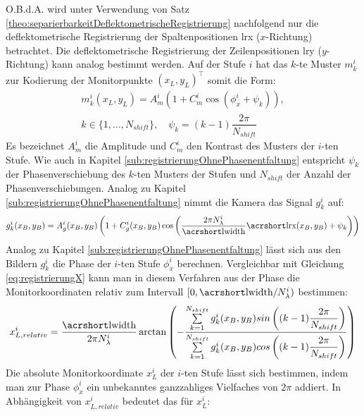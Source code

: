 \p
O.B.d.A. wird unter Verwendung von Satz \ref{theo:separierbarkeitDeflektometrischeRegistrierung} nachfolgend nur die deflektometrische Registrierung der Spaltenpositionen \acrshort{lrx} ($x$-Richtung) betrachtet.
Die deflektometrische Registrierung der Zeilenpositionen \acrshort{lry} ($y$-Richtung) kann analog bestimmt werden.
Auf der Stufe $i$ hat das $k$-te Muster $m_k^i$ zur Kodierung der Monitorpunkte $(x_L, y_L)^\top$ somit die Form:
%
\begin{equation}\label{eq:monitormuster_mehrstufig}
	\begin{gathered}	
		m_k^i(x_L,y_L) = A_m^i \left(1 + C_m^i \cos \left(\phi_x^i + \psi_k\right)\right),\\
		k \in \lbrace 1,\ldots,N_{shift}\rbrace,
		\quad
		\psi_k = (k - 1)\dfrac{2\pi}{N_{shift}}
	\end{gathered}
\end{equation}
%
Es bezeichnet $A_m^i$ die Amplitude und $C_m^i$ den Kontrast des Musters der $i$-ten Stufe.
Wie auch in Kapitel \ref{sub:registrierungOhnePhasenentfaltung} entspricht $\psi_k$ der Phasenverschiebung des $k$-ten Musters der Stufen und $N_{shift}$ der Anzahl der Phasenverschiebungen.
Analog zu Kapitel \ref{sub:registrierungOhnePhasenentfaltung} nimmt die Kamera das Signal $g_k^i$ auf:
%
\begin{equation}\label{eq:kamerabild_mehrstufig}
	g_k^i(x_B, y_B) = A_g^i(x_B, y_B) \left(1 + C_g^i(x_B, y_B) \cos \left(\dfrac{2\pi N_\lambda^i}{\acrshortmath{lwidth}}\acrshortmath{lrx}(x_B, y_B) + \psi_k\right)\right)
\end{equation}
%
Analog zu Kapitel \ref{sub:registrierungOhnePhasenentfaltung} lässt sich aus den Bildern $g_k^i$ die Phase der $i$-ten Stufe $\phi_x^i$ berechnen.
Vergleichbar mit Gleichung \ref{eq:registrierungX} kann man in diesem Verfahren aus der Phase die Monitorkoordinaten relativ zum Intervall $[0,\acrshortmath{lwidth}/N_\lambda^i)$ bestimmen:
%
\begin{equation}\label{eq:registrierungX_relativ}
	x_{L,relativ}^i =
	\dfrac{\acrshortmath{lwidth}}{2\pi N_\lambda^i}
	\arctan 
	\left( 
		-\dfrac
		{\sum\limits_{k=1}^{N_{shift}} g_k^i(x_B, y_B) sin\left((k - 1)\dfrac{2\pi}{N_{shift}}\right)}
		{\sum\limits_{k=1}^{N_{shift}} g_k^i(x_B, y_B) cos\left((k - 1)\dfrac{2\pi}{N_{shift}}\right)}
	\right)
\end{equation}
%
Die absolute Monitorkoordinate $x_L^i$ der $i$-ten Stufe lässt sich bestimmen, indem man zur Phase $\phi_x^i$ ein unbekanntes ganzzahliges Vielfaches von $2\pi$ addiert.
In Abhängigkeit von $x_{L,relativ}^i$ bedeutet das für $x_L^i$:
